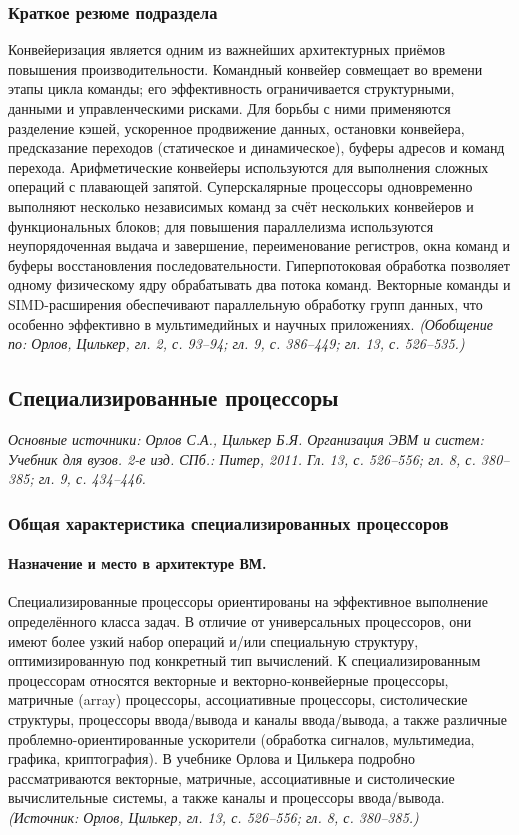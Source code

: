 \documentclass[a4paper,12pt]{article}
\begin{document}
\subsubsection{Краткое резюме подраздела}
Конвейеризация является одним из важнейших архитектурных приёмов повышения производительности. Командный конвейер совмещает во времени этапы цикла команды; его эффективность ограничивается структурными, данными и управленческими рисками. Для борьбы с ними применяются разделение кэшей, ускоренное продвижение данных, остановки конвейера, предсказание переходов (статическое и динамическое), буферы адресов и команд перехода. Арифметические конвейеры используются для выполнения сложных операций с плавающей запятой. Суперскалярные процессоры одновременно выполняют несколько независимых команд за счёт нескольких конвейеров и функциональных блоков; для повышения параллелизма используются неупорядоченная выдача и завершение, переименование регистров, окна команд и буферы восстановления последовательности. Гиперпотоковая обработка позволяет одному физическому ядру обрабатывать два потока команд. Векторные команды и SIMD-расширения обеспечивают параллельную обработку групп данных, что особенно эффективно в мультимедийных и научных приложениях.
\textit{(Обобщение по: Орлов, Цилькер, гл. 2, с. 93--94; гл. 9, с. 386--449; гл. 13, с. 526--535.)}

\subsection{Специализированные процессоры}

\noindent\textit{Основные источники: Орлов С.А., Цилькер Б.Я. Организация ЭВМ и систем: Учебник для вузов. 2-е изд. СПб.: Питер, 2011. Гл. 13, с. 526--556; гл. 8, с. 380--385; гл. 9, с. 434--446.}

\subsubsection{Общая характеристика специализированных процессоров}

\paragraph{Назначение и место в архитектуре ВМ.}
Специализированные процессоры ориентированы на эффективное выполнение определённого класса задач. В отличие от универсальных процессоров, они имеют более узкий набор операций и/или специальную структуру, оптимизированную под конкретный тип вычислений. К специализированным процессорам относятся векторные и векторно-конвейерные процессоры, матричные (array) процессоры, ассоциативные процессоры, систолические структуры, процессоры ввода/вывода и каналы ввода/вывода, а также различные проблемно-ориентированные ускорители (обработка сигналов, мультимедиа, графика, криптография). В учебнике Орлова и Цилькера подробно рассматриваются векторные, матричные, ассоциативные и систолические вычислительные системы, а также каналы и процессоры ввода/вывода.
\textit{(Источник: Орлов, Цилькер, гл. 13, с. 526--556; гл. 8, с. 380--385.)}
\end{document}
